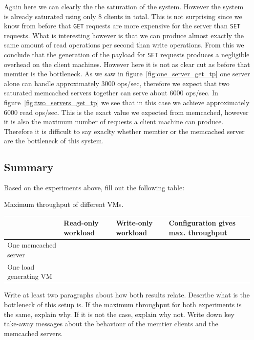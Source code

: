 \documentclass[11pt,a4paper]{article}
\begin{document}
%
Again here we can clearly the the saturation of the system.
%
However the system is already saturated using only 8 clients in total.
%
This is not surprising since we know from before that \texttt{GET} requests are more expensive for the server than \texttt{SET} requests.
%
What is interesting however is that we can produce almost exactly the same amount of read operations per second than write operations. 
%
From this we conclude that the generation of the payload for \texttt{SET} requests produces a negligible overhead on the client machines.
%
However here it is not as clear cut as before that memtier is the bottleneck.
%
As we saw in figure~\ref{fig:one_server_get_tp} one server alone can handle approximately 3000 ops/sec, therefore we expect that two saturated memcached servers together can serve about 6000 ops/sec.
%
In figure~\ref{fig:two_servers_get_tp} we see that in this case we achieve approximately 6000 read ops/sec.
%
This is the exact value we expected from memcached, however it is also the maximum number of requests a client machine can produce.
%
Therefore it is difficult to say exaclty whether memtier or the memcached server are the bottleneck of this system.
%
%
\subsection{Summary}

Based on the experiments above, fill out the following table:

\begin{center}
	{Maximum throughput of different VMs.}
	\begin{tabular}{|l|p{2cm}|p{2cm}|p{4cm}|}
		\hline                        & Read-only workload & Write-only workload & Configuration gives max. throughput \\ 
		\hline One memcached server   &                    &                     &                                     \\ 
		\hline One load generating VM &                    &                     &                                     \\ 
		\hline 
	\end{tabular}
\end{center}


Write at least two paragraphs about how both results relate. Describe what is the bottleneck of this setup is. If the maximum throughput for both experiments is the same, explain why. If it is not the case, explain why not. Write down key take-away messages about the behaviour of the memtier clients and the memcached servers.
\end{document}
